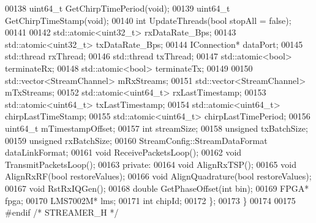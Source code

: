 \begin{DoxyCode}
00138     uint64\_t GetChirpTimePeriod(\textcolor{keywordtype}{void});
00139     uint64\_t GetChirpTimeStamp(\textcolor{keywordtype}{void});
00140     \textcolor{keywordtype}{int} UpdateThreads(\textcolor{keywordtype}{bool} stopAll = \textcolor{keyword}{false});
00141 
00142     std::atomic<uint32\_t> rxDataRate_Bps;
00143     std::atomic<uint32\_t> txDataRate_Bps;
00144     IConnection* dataPort;
00145     std::thread rxThread;
00146     std::thread txThread;
00147     std::atomic<bool> terminateRx;
00148     std::atomic<bool> terminateTx;
00149 
00150     std::vector<StreamChannel> mRxStreams;
00151     std::vector<StreamChannel> mTxStreams;
00152     std::atomic<uint64\_t> rxLastTimestamp;
00153     std::atomic<uint64\_t> txLastTimestamp;
00154     std::atomic<uint64\_t> chirpLastTimeStamp;
00155     std::atomic<uint64\_t> chirpLastTimePeriod;
00156     uint64\_t mTimestampOffset;
00157     \textcolor{keywordtype}{int} streamSize;
00158     \textcolor{keywordtype}{unsigned} txBatchSize;
00159     \textcolor{keywordtype}{unsigned} rxBatchSize;
00160     StreamConfig::StreamDataFormat dataLinkFormat;
00161     \textcolor{keywordtype}{void} ReceivePacketsLoop();
00162     \textcolor{keywordtype}{void} TransmitPacketsLoop();
00163 \textcolor{keyword}{private}:
00164     \textcolor{keywordtype}{void} AlignRxTSP();
00165     \textcolor{keywordtype}{void} AlignRxRF(\textcolor{keywordtype}{bool} restoreValues);
00166     \textcolor{keywordtype}{void} AlignQuadrature(\textcolor{keywordtype}{bool} restoreValues);
00167     \textcolor{keywordtype}{void} RstRxIQGen();
00168     \textcolor{keywordtype}{double} GetPhaseOffset(\textcolor{keywordtype}{int} bin);
00169     FPGA* fpga;
00170     LMS7002M* lms;
00171     \textcolor{keywordtype}{int} chipId;
00172 \};
00173 \}
00174 
00175 \textcolor{preprocessor}{#endif }\textcolor{comment}{/* STREAMER\_H */}\textcolor{preprocessor}{}
\end{DoxyCode}
